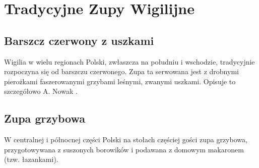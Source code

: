\chapter{Tradycyjne Zupy Wigilijne}

\section{Barszcz czerwony z uszkami}
Wigilia w wielu regionach Polski, zwłaszcza na południu i wschodzie, tradycyjnie rozpoczyna się od barszczu czerwonego. Zupa ta serwowana jest z drobnymi pierożkami faszerowanymi grzybami leśnymi, zwanymi uszkami. Opisuje to szczegółowo A. Nowak \cite{nowak2018}.

\section{Zupa grzybowa}
W centralnej i północnej części Polski na stołach częściej gości zupa grzybowa, przygotowywana z suszonych borowików i podawana z domowym makaronem (tzw. łazankami).